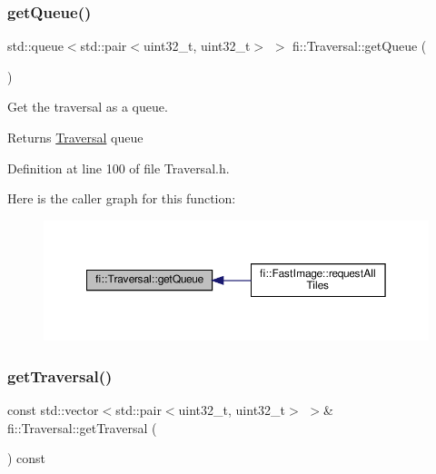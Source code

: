 \mbox{\label{classfi_1_1Traversal_a98b73bee5830777b04e3757fb940209a}} 
\subsubsection{\texorpdfstring{get\+Queue()}{getQueue()}}
{\footnotesize\ttfamily std\+::queue$<$std\+::pair$<$uint32\+\_\+t, uint32\+\_\+t$>$ $>$ fi\+::\+Traversal\+::get\+Queue (\begin{DoxyParamCaption}{ }\end{DoxyParamCaption})\hspace{0.3cm}{\ttfamily [inline]}}



Get the traversal as a queue. 

\begin{DoxyReturn}{Returns}
\hyperlink{classfi_1_1Traversal}{Traversal} queue 
\end{DoxyReturn}


Definition at line 100 of file Traversal.\+h.

Here is the caller graph for this function\+:
\nopagebreak
\begin{figure}[H]
\begin{center}
\leavevmode
\includegraphics[width=350pt]{d8/d0e/classfi_1_1Traversal_a98b73bee5830777b04e3757fb940209a_icgraph}
\end{center}
\end{figure}
\mbox{\label{classfi_1_1Traversal_a5642cddfccb1e3b914615771164511f1}} 
\subsubsection{\texorpdfstring{get\+Traversal()}{getTraversal()}}
{\footnotesize\ttfamily const std\+::vector$<$std\+::pair$<$uint32\+\_\+t, uint32\+\_\+t$>$ $>$\& fi\+::\+Traversal\+::get\+Traversal (\begin{DoxyParamCaption}{ }\end{DoxyParamCaption}) const\hspace{0.3cm}{\ttfamily [inline]}}



